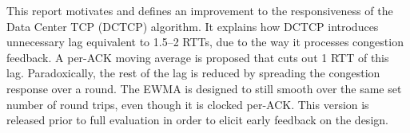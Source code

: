 This report motivates and defines an improvement to the responsiveness of the Data 
Center TCP (DCTCP) algorithm.
It explains how DCTCP introduces unnecessary lag
equivalent to 1.5--2 RTTs, due to the way it processes congestion feedback. A
per-ACK moving average is proposed that cuts out 1 RTT of this lag.
Paradoxically, the rest of the lag is reduced by spreading the congestion
response over a round. The EWMA is designed to still smooth over the same set
number of round trips, even though it is clocked per-ACK. 
This version is released prior to full evaluation in order to elicit early feedback on the design. %
